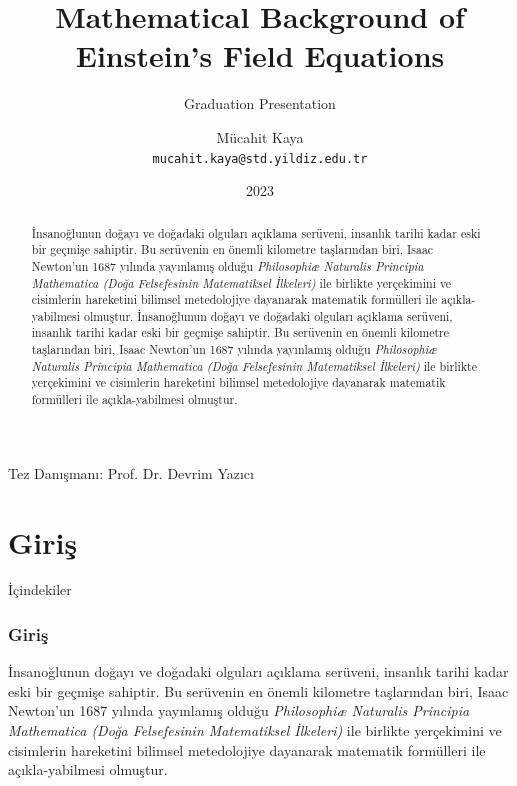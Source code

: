 \documentclass[aspectratio=169]{beamer}
\title{Mathematical Background of Einstein's Field Equations}
\institute{Yıldız Teknik Üniversitesi Fizik Bölümü}
\date{2023}
\author[kaya-m]{Mücahit Kaya \\ \texttt{mucahit.kaya@std.yildiz.edu.tr}}
\subtitle{Graduation Presentation}
\begin{document}
\begin{frame}
    \titlepage
    Tez Danışmanı: Prof. Dr. Devrim Yazıcı
\end{frame}


\begin{frame}
    \begin{abstract}
        İnsanoğlunun doğayı ve doğadaki olguları açıklama serüveni, insanlık tarihi kadar eski bir geçmişe sahiptir. Bu serüvenin en önemli kilometre taşlarından biri, Isaac Newton'un 1687 yılında yayınlamış olduğu \textit{Philosophiæ Naturalis Principia Mathematica (Doğa Felsefesinin Matematiksel İlkeleri)} ile birlikte yerçekimini ve cisimlerin hareketini bilimsel metedolojiye dayanarak matematik formülleri ile açıkla-yabilmesi olmuştur.         İnsanoğlunun doğayı ve doğadaki olguları açıklama serüveni, insanlık tarihi kadar eski bir geçmişe sahiptir. Bu serüvenin en önemli kilometre taşlarından biri, Isaac Newton'un 1687 yılında yayınlamış olduğu \textit{Philosophiæ Naturalis Principia Mathematica (Doğa Felsefesinin Matematiksel İlkeleri)} ile birlikte yerçekimini ve cisimlerin hareketini bilimsel metedolojiye dayanarak matematik formülleri ile açıkla-yabilmesi olmuştur. 
    \end{abstract}
\end{frame}



\section{Giriş}
     
    \begin{frame}{İçindekiler}
        \tableofcontents[currentsection]
    \end{frame}


    \begin{frame}
        \frametitle{Giriş}       
        İnsanoğlunun doğayı ve doğadaki olguları açıklama serüveni, insanlık tarihi kadar eski bir geçmişe sahiptir. Bu serüvenin en önemli kilometre taşlarından biri, Isaac Newton'un 1687 yılında yayınlamış olduğu \textit{Philosophiæ Naturalis Principia Mathematica (Doğa Felsefesinin Matematiksel İlkeleri)} ile birlikte yerçekimini ve cisimlerin hareketini bilimsel metedolojiye dayanarak matematik formülleri ile açıkla-yabilmesi olmuştur. 
    \end{frame}
\end{document}
